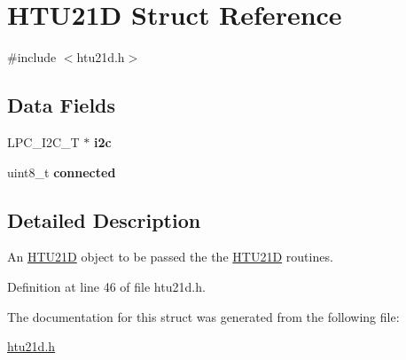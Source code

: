 \hypertarget{structHTU21D}{}\section{H\+T\+U21D Struct Reference}
\label{structHTU21D}


{\ttfamily \#include $<$htu21d.\+h$>$}

\subsection*{Data Fields}
\begin{DoxyCompactItemize}
\item 
L\+P\+C\+\_\+\+I2\+C\+\_\+T $\ast$ {\bfseries i2c}\hypertarget{structHTU21D_ab8e165e384bebdc26d983df9eb211556}{}\label{structHTU21D_ab8e165e384bebdc26d983df9eb211556}

\item 
uint8\+\_\+t {\bfseries connected}\hypertarget{structHTU21D_a31081cc186d88df29eaa666cdcb50ee1}{}\label{structHTU21D_a31081cc186d88df29eaa666cdcb50ee1}

\end{DoxyCompactItemize}


\subsection{Detailed Description}
An \hyperlink{structHTU21D}{H\+T\+U21D} object to be passed the the \hyperlink{structHTU21D}{H\+T\+U21D} routines. 

Definition at line 46 of file htu21d.\+h.



The documentation for this struct was generated from the following file\+:\begin{DoxyCompactItemize}
\item 
\hyperlink{htu21d_8h}{htu21d.\+h}\end{DoxyCompactItemize}
